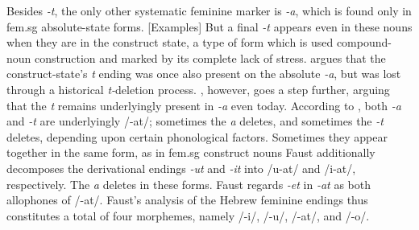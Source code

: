 Besides \textit{-t}, the only other systematic feminine marker is 
\textit{-a}, which is found only 
in fem.sg absolute-state forms. [Examples]
But a final \textit{-t} appears even in these nouns when they are 
in the construct state, a type of form which is used compound-noun 
construction and marked by its complete lack of stress.
\cite{schwarzwald:1982} argues that
the construct-state's \textit{t} ending was once also 
present on the absolute \textit{-a}, but was lost through a historical
\textit{t-}deletion process. \cite{faust:2013}, however, 
goes a step further, arguing that the \textit{t} remains 
underlyingly present in \textit{-a} even today. According 
to \cite{faust:2013}, both
\textit{-a} and \textit{-t} are underlyingly /-at/; sometimes 
the \textit{a} deletes, and sometimes the \textit{-t} deletes, depending 
upon certain phonological factors. Sometimes they appear 
together in the same form, as in fem.sg construct nouns
Faust additionally decomposes the derivational endings 
\textit{-ut} and \textit{-it} into /u-at/ and /i-at/, respectively. 
The \textit{a} deletes in these forms.
Faust regards \textit{-et} in \textit{-at} as both allophones of /-at/. 
Faust's analysis of the Hebrew feminine endings thus constitutes a total of 
four morphemes, namely /-i/, /-u/, /-at/, and /-o/.


%
 


